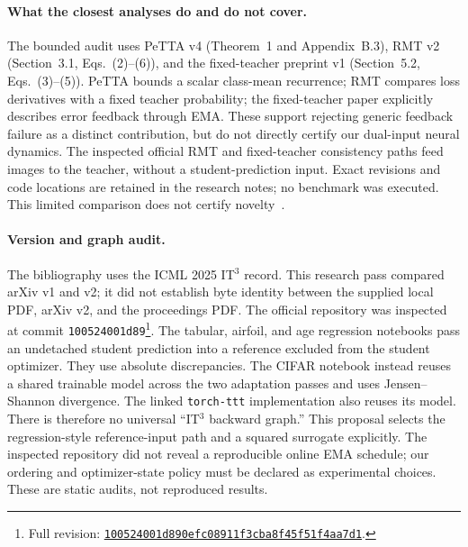 \documentclass[11pt,a4paper]{article}
\begin{document}
\paragraph{What the closest analyses do and do not cover.}
The bounded audit uses PeTTA v4 (Theorem~1 and Appendix~B.3), RMT v2
(Section~3.1, Eqs.~(2)--(6)), and the fixed-teacher preprint v1
(Section~5.2, Eqs.~(3)--(5)). PeTTA bounds a scalar class-mean recurrence;
RMT compares loss derivatives with a fixed teacher probability;
the fixed-teacher paper explicitly describes error feedback through EMA.
These support rejecting generic feedback failure as a distinct contribution,
but do not directly certify our dual-input neural dynamics.
The inspected official RMT and fixed-teacher consistency paths feed images
to the teacher, without a student-prediction input. Exact revisions and code
locations are retained in the research notes; no benchmark was executed.
This limited comparison does not certify novelty~\cite{petta,rmt,fixedteacher}.

\paragraph{Version and graph audit.}
The bibliography uses the ICML 2025 IT$^3$ record. This research pass compared
arXiv v1 and v2; it did not establish byte identity between the supplied
local PDF, arXiv v2, and the proceedings PDF. The official repository was
inspected at commit \texttt{100524001d89}\footnote{Full revision:
\href{https://github.com/nikitadurasov/ittt/tree/100524001d890efc08911f3cba8f45f51f4aa7d1}{\texttt{100524001d890efc08911f3cba8f45f51f4aa7d1}}.}.
The tabular, airfoil, and age regression notebooks pass an undetached student
prediction into a reference excluded from the student optimizer. They use
absolute discrepancies. The CIFAR notebook instead reuses a shared
trainable model across the two adaptation passes and uses Jensen--Shannon
divergence. The linked \texttt{torch-ttt} implementation also reuses its
model. There is therefore no universal ``IT$^3$ backward graph.'' This
proposal selects the regression-style reference-input path and a squared
surrogate explicitly. The inspected repository did not reveal a reproducible
online EMA schedule; our ordering and optimizer-state policy must be declared
as experimental choices. These are static audits, not reproduced results.
\end{document}
